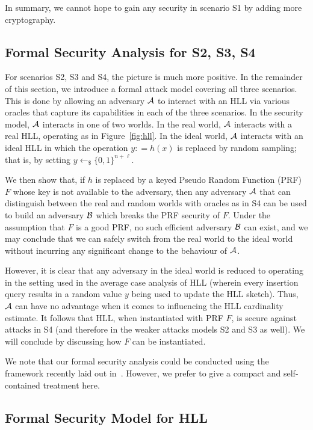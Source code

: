 \documentclass{article}
\begin{document}
In summary, we cannot hope to gain any security in scenario S1 by adding more cryptography.

\subsection{Formal Security Analysis for S2, S3, S4}

For scenarios S2, S3 and S4, the picture is much more positive. In the remainder of this section, we introduce a formal attack model covering all three scenarios. This is done by allowing an adversary ${\cal A}$ to interact with an HLL via various oracles that capture its capabilities in each of the three scenarios. In the security model, ${\cal A}$ interacts in one of two worlds. In the real world, ${\cal A}$ interacts with a real HLL, operating as in Figure~\ref{fig:hll}. In the ideal world, ${\cal A}$ interacts with an ideal HLL in which the operation $y: = h(x)$ is replaced by random sampling; that is, by setting $y \leftarrow_{\$} \{0,1\}^{n+\ell}$. 

We then show that, if $h$ is replaced by a keyed Pseudo Random Function (PRF) $F$ whose key is not available to the adversary, then any adversary ${\cal A}$ that can distinguish between the real and random worlds with oracles as in S4 can be used to build an adversary ${\cal B}$ which breaks the PRF security of $F$. Under the assumption that $F$ is a good PRF, no such efficient adversary ${\cal B}$ can exist, and we may conclude that we can safely switch from the real world to the ideal world without incurring any significant change to the behaviour of ${\cal A}$. 

However, it is clear that any adversary in the ideal world is reduced to operating in the setting used in the average case analysis of HLL (wherein every insertion query results in a random value $y$ being used to update the HLL sketch). Thus, ${\cal A}$ can have no advantage when it comes to influencing the HLL cardinality estimate. It follows that HLL, when instantiated with PRF $F$, is secure against attacks in S4 (and therefore in the weaker attacks models S2 and S3 as well). We will conclude by discussing how $F$ can be instantiated.

We note that our formal security analysis could be conducted using the framework recently laid out in~\cite{CCS:ClaPatShrPS19}. However, we prefer to give a compact and self-contained treatment here.

\subsection{Formal Security Model for HLL}
\end{document}
